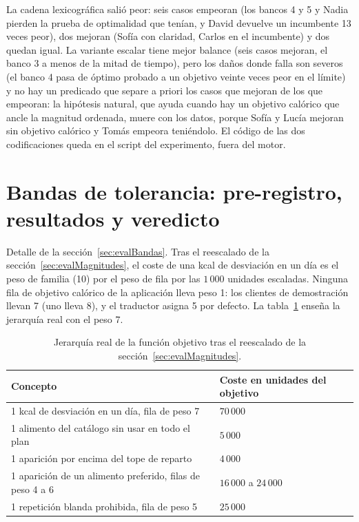 La cadena lexicográfica salió peor: seis casos empeoran (los bancos 4 y 5 y Nadia pierden la prueba de optimalidad que tenían, y David devuelve un incumbente 13 veces peor), dos mejoran (Sofía con claridad, Carlos en el incumbente) y dos quedan igual. La variante escalar tiene mejor balance (seis casos mejoran, el banco 3 a menos de la mitad de tiempo), pero los daños donde falla son severos (el banco 4 pasa de óptimo probado a un objetivo veinte veces peor en el límite) y no hay un predicado que separe a priori los casos que mejoran de los que empeoran: la hipótesis natural, que ayuda cuando hay un objetivo calórico que ancle la magnitud ordenada, muere con los datos, porque Sofía y Lucía mejoran sin objetivo calórico y Tomás empeora teniéndolo. El código de las dos codificaciones queda en el script del experimento, fuera del motor.

\section{Bandas de tolerancia: pre-registro, resultados y veredicto}
\label{sec:anexoBandas}

Detalle de la sección~\ref{sec:evalBandas}. Tras el reescalado de la sección~\ref{sec:evalMagnitudes}, el coste de una kcal de desviación en un día es el peso de familia (10) por el peso de fila por las $1\,000$ unidades escaladas. Ninguna fila de objetivo calórico de la aplicación lleva peso 1: los clientes de demostración llevan 7 (uno lleva 8), y el traductor asigna 5 por defecto. La tabla~\ref{tab:jerarquia} enseña la jerarquía real con el peso 7.

\begin{table}[htbp]
\centering
\small
\begin{tabular}{|p{8.6cm}|p{3.4cm}|}
\hline
\textbf{Concepto} & \textbf{Coste en unidades del objetivo} \\
\hline
1 kcal de desviación en un día, fila de peso 7 & $70\,000$ \\
\hline
1 alimento del catálogo sin usar en todo el plan & $5\,000$ \\
\hline
1 aparición por encima del tope de reparto & $4\,000$ \\
\hline
1 aparición de un alimento preferido, filas de peso 4 a 6 & $16\,000$ a $24\,000$ \\
\hline
1 repetición blanda prohibida, fila de peso 5 & $25\,000$ \\
\hline
\end{tabular}
\caption{Jerarquía real de la función objetivo tras el reescalado de la sección~\ref{sec:evalMagnitudes}.}
\label{tab:jerarquia}
\end{table}

